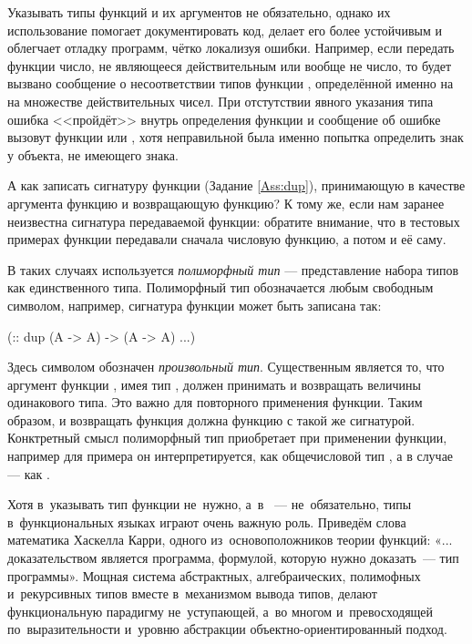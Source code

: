 Указывать типы функций и их аргументов не обязательно, однако их использование помогает документировать код, делает его более устойчивым и облегчает отладку программ, чётко локализуя ошибки. Например, если передать функции  число, не являющееся действительным или вообще не число, то будет вызвано сообщение о несоответствии типов функции , определённой именно на на множестве действительных чисел. При отстутствии явного указания типа ошибка <<пройдёт>> внутрь определения функции и сообщение об ошибке вызовут функции  или , хотя неправильной была именно попытка определить знак у объекта, не имеющего знака.

А как записать сигнатуру функции  (Задание \ref{Ass:dup}), принимающую в качестве аргумента функцию и возвращающую функцию? К тому же, если нам заранее неизвестна сигнатура передаваемой функции: обратите внимание, что в тестовых примерах функции  передавали сначала числовую функцию, а потом и её саму. 

В таких случаях используется  \emph{полиморфный тип} --- представление набора типов как единственного типа. Полиморфный тип обозначается любым свободным символом, например, сигнатура функции  может быть записана так:

\begin{SchemeCode}
 (:: dup (A -> A) -> (A -> A)
   ...)
\end{SchemeCode}

Здесь символом  обозначен \emph{произвольный тип}. Существенным является то, что аргумент функции , имея тип , должен принимать и возвращать величины одинакового типа. Это важно для повторного применения функции. Таким образом, и возвращать функция  должна функцию с такой же сигнатурой. Конктретный смысл полиморфный тип  приобретает при применении функции, например для примера  он интерпретируется, как общечисловой тип , а в случае  --- как .

Хотя в~\Scheme указывать тип функции не~нужно, а~в ~--- не~обязательно, типы в~функциональных языках играют очень важную роль. Приведём слова математика Хаскелла Карри, одного из~основоположников теории функций: «... доказательством является программа, формулой, которую нужно доказать~--- тип программы». Мощная система абстрактных, алгебраических, полимофных и~рекурсивных типов вместе в~механизмом вывода типов, делают функциональную парадигму не~уступающей, а~во многом и~превосходящей по~выразительности и~уровню абстракции объектно-ориентированный подход.

